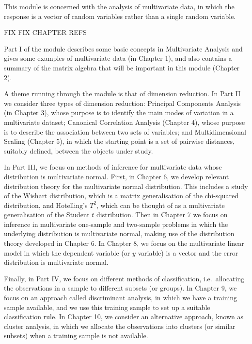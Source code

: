 \documentclass[]{book}
\theoremstyle{definition}
\theoremstyle{definition}
\theoremstyle{definition}
\theoremstyle{remark}
\begin{document}
\newcommand{\tcov}{\text{cov}}
\newcommand{\texp}{\text{exp}}
\newcommand{\lb}{\left(}
\newcommand{\rb}{\right)}
\newcommand{\lsb}{\left[}
\newcommand{\rsb}{\right]}
\newcommand{\BE}{{\mathbb{E}}}
\newcommand{\cov}{{\mathbb{C}\operatorname{ov}}}
\newcommand{\var}{{\mathbb{V}\operatorname{ar}}}

This module is concerned with the analysis of multivariate data, in which the response is a vector of random variables rather than a single random variable.

FIX FIX CHAPTER REFS

Part I of the module describes some basic concepts in Multivariate Analysis and gives some examples of multivariate data (in Chapter 1), and also contains a summary of the matrix algebra that will be important in this module (Chapter 2).

A theme running through the module is that of dimension reduction. In Part II we consider three types of dimension reduction: Principal Components Analysis (in Chapter 3),
whose purpose is to identify the main modes of variation in a multivariate dataset; Canonical Correlation Analysis (Chapter 4), whose purpose is to describe the association between two sets of variables; and Multidimensional Scaling (Chapter 5), in which the starting point is a set of pairwise distances, suitably defined, between the objects under study.

In Part III, we focus on methods of inference for multivariate data whose distribution is multivariate normal. First, in Chapter 6, we develop relevant distribution theory for the multivariate normal distribution. This includes a study of the Wishart distribution, which is a matrix generalisation of the chi-squared distribution, and Hotelling's \(T^2\), which can be thought of as a multivariate generalisation of the Student \(t\) distribution. Then in Chapter 7 we focus on inference in multivariate one-sample and two-sample problems in which the underlying distribution is multivariate normal, making use of the distribution theory developed in Chapter 6. In Chapter 8, we focus on the multivariate linear model in which the dependent variable (or \(y\) variable) is a vector and the error distribution is multivariate normal.

Finally, in Part IV, we focus on different methods of classification, i.e.~allocating the observations in a sample to different subsets (or groups). In Chapter 9, we focus on an approach called discriminant analysis, in which we have a training sample available, and we use this training sample to set up a suitable classification rule. In Chapter 10, we consider an alternative approach, known as cluster analysis, in which we allocate the observations into clusters (or similar subsets) when a training sample is not available.
\end{document}
